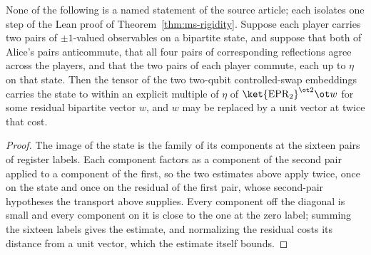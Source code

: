 \begin{lemma}\label{lem:ms-rigidity-support-joint-state}
	\leanok
	None of the following is a named statement of the source article; each isolates one step of the Lean proof of Theorem~\ref{thm:ms-rigidity}. Suppose each player carries two pairs of $\pm 1$-valued observables on a bipartite state, and suppose that both of Alice's pairs anticommute, that all four pairs of corresponding reflections agree across the players, and that the two pairs of each player commute, each up to $\eta$ on that state. Then the tensor of the two two-qubit controlled-swap embeddings carries the state to within an explicit multiple of $\eta$ of $\ket{\mathrm{EPR}_2}^{\ot 2} \ot w$ for some residual bipartite vector $w$, and $w$ may be replaced by a unit vector at twice that cost.
\end{lemma}
\begin{proof}
	\leanok
	The image of the state is the family of its components at the sixteen pairs of register labels. Each component factors as a component of the second pair applied to a component of the first, so the two estimates above apply twice, once on the state and once on the residual of the first pair, whose second-pair hypotheses the transport above supplies. Every component off the diagonal is small and every component on it is close to the one at the zero label; summing the sixteen labels gives the estimate, and normalizing the residual costs its distance from a unit vector, which the estimate itself bounds.
\end{proof}

